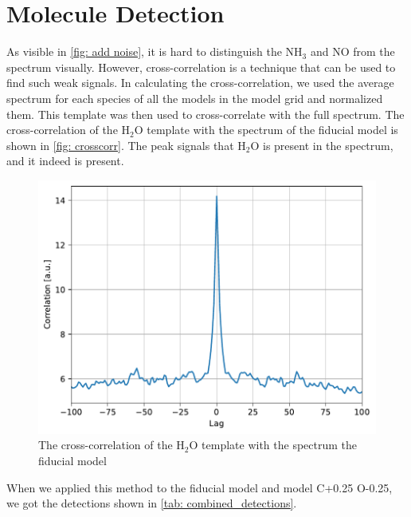 \documentclass[twoside, single, authoryear, semicolon, 12pt]{lion-msc}
\newcommand{\4}{$_4$}
\newcommand{\3}{$_3$}
\newcommand{\2}{$_2$}
\begin{document}
\section{Molecule Detection}
As visible in \autoref{fig: add noise}, it is hard to distinguish the NH\3 and NO from the spectrum visually. However, cross-correlation is a technique that can be used to find such weak signals. In calculating the cross-correlation, we used the average spectrum for each species of all the models in the model grid and normalized them. This template was then used to cross-correlate with the full spectrum. The cross-correlation of the H\2O template with the spectrum of the fiducial model is shown in \autoref{fig: crosscorr}. The peak signals that H\2O is present in the spectrum, and it indeed is present. 

\begin{figure}[H]
    \centering
    \includegraphics[width=.6\linewidth]{Figures/Cross-Correlation.pdf}
    \caption{The cross-correlation of the H\2O template with the spectrum the fiducial model}
    \label{fig: crosscorr}
\end{figure}

When we applied this method to the fiducial model and model C+0.25 O-0.25, we got the detections shown in \autoref{tab: combined_detections}. 

\end{document}
